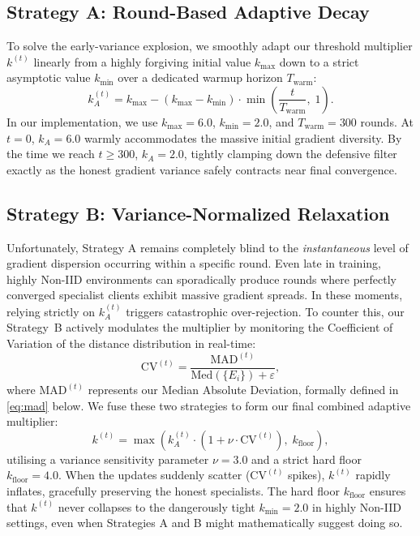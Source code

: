 \documentclass[../main.tex]{subfiles}
\begin{document}
\subsection{Strategy A: Round-Based Adaptive Decay}
\label{sec:aegis_strategy_a}

To solve the early-variance explosion, we smoothly adapt our threshold multiplier $k^{(t)}$ linearly from a highly forgiving initial value $k_{\max}$ down to a strict asymptotic value $k_{\min}$ over a dedicated warmup horizon $T_{\text{warm}}$:
\begin{equation}
    k_A^{(t)} = k_{\max} - \left(k_{\max} - k_{\min}\right) \cdot \min\!\left(\frac{t}{T_{\text{warm}}},\; 1\right).
    \label{eq:strategy_a}
\end{equation}
In our implementation, we use $k_{\max} = 6.0$, $k_{\min} = 2.0$, and $T_{\text{warm}} = 300$ rounds. At $t = 0$, $k_A = 6.0$ warmly accommodates the massive initial gradient diversity. By the time we reach $t \geq 300$, $k_A = 2.0$, tightly clamping down the defensive filter exactly as the honest gradient variance safely contracts near final convergence.

\subsection{Strategy B: Variance-Normalized Relaxation}
\label{sec:aegis_strategy_b}

Unfortunately, Strategy A remains completely blind to the \emph{instantaneous} level of gradient dispersion occurring within a specific round. Even late in training, highly Non-IID environments can sporadically produce rounds where perfectly converged specialist clients exhibit massive gradient spreads. In these moments, relying strictly on $k_A^{(t)}$ triggers catastrophic over-rejection. To counter this, our Strategy~B actively modulates the multiplier by monitoring the Coefficient of Variation of the distance distribution in real-time:
\begin{equation}
    \mathrm{CV}^{(t)} = \frac{\mathrm{MAD}^{(t)}}{\mathrm{Med}(\{E_i\}) + \varepsilon},
    \label{eq:cv}
\end{equation}
where $\mathrm{MAD}^{(t)}$ represents our Median Absolute Deviation, formally defined in \eqref{eq:mad} below. We fuse these two strategies to form our final combined adaptive multiplier:
\begin{equation}
    k^{(t)} = \max\!\left(k_A^{(t)} \cdot \left(1 + \nu \cdot \mathrm{CV}^{(t)}\right),\; k_{\text{floor}}\right),
    \label{eq:adaptive_k_combined}
\end{equation}
utilising a variance sensitivity parameter $\nu = 3.0$ and a strict hard floor $k_{\text{floor}} = 4.0$. When the updates suddenly scatter ($\mathrm{CV}^{(t)}$ spikes), $k^{(t)}$ rapidly inflates, gracefully preserving the honest specialists. The hard floor $k_{\text{floor}}$ ensures that $k^{(t)}$ never collapses to the dangerously tight $k_{\min} = 2.0$ in highly Non-IID settings, even when Strategies A and B might mathematically suggest doing so.
\end{document}
